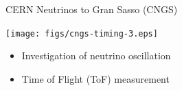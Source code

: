 \documentclass[compress,red]{beamer}
\begin{document}
\begin{frame}{CERN Neutrinos to Gran Sasso (CNGS)}

    \begin{center}
      \texttt{[image: figs/cngs-timing-3.eps]}
    \end{center}

    \begin{center}
      \begin{itemize}
	\item Investigation of neutrino oscillation
	\item Time of Flight (ToF) measurement
      \end{itemize}

    \end{center}


\end{frame}
% 
% 
% 
\end{document}
